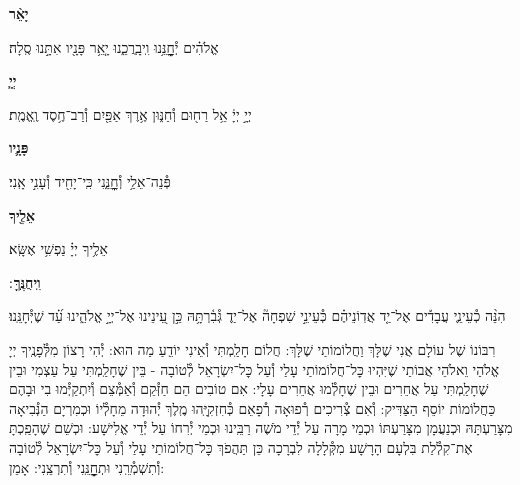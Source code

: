 \documentclass[twoside, openany, parskip=half, 11pt]{book}
\begin{document}
\textbf{יָאֵ֨ר}
\hfill \begin{footnotesize}
אֱלֹהִ֗ים יְ֯חׇׇׇׇׇׇׇׇנֵּ֥נוּ וִֽיבָֽרֲכֵ֑נוּ יָ֤אֵ֥ר פָּנָ֖יו אִתָּ֣נוּ סֶֽלָה׃\\
\end{footnotesize}
\textbf{יְיָ֧}
\hfill \begin{footnotesize}
יְיָ֣ יְיָ֔ אֵ֥ל רַח֖וּם וְ֯חַנּ֑וּן אֶ֥רֶךְ אַפַּ֖יִם וְ֯רַב־חֶ֥סֶד וֶֽאֱמֶֽת׃\\
\end{footnotesize}
\textbf{פָּנָ֛יו}
\hfill \begin{footnotesize}
פְּ֯נֵה־אֵלַ֥י וְ֯חׇׇׇׇׇׇׇׇׇׇנֵּ֑נִי כִּֽי־יָחִ֖יד וְ֯עָנִ֣י אָֽנִי׃\\
\end{footnotesize}
\textbf{אֵלֶ֖יךָ}
\hfill \begin{footnotesize}
אֵלֶ֥יךָ יְיָ֗ נַפְשִׁ֥י אֶשָּֽׂא׃\\
\end{footnotesize}
\textbf{וִֽיחֻנֶּֽךָּ}
׃ \hfill \begin{footnotesize}
הִנֵּ֨ה כְ֯עֵינֵ֢י עֲבָדִ֡ים אֶל־יַ֤ד אֲדֽוֹנֵיהֶ֗ם כְּ֯עֵינֵ֣י שִׁפְחָה֘ אֶל־יַד֢ גְּ֯בִ֫רְתָּ֥הּ כֵּ֣ן עֵ֭ינֵינוּ אֶל־יְיָ֣ אֱלֹהֵ֑ינוּ עַ֝֗ד שֶׁיְּ֯חָנֵּֽנוּ׃
\end{footnotesize}


רִבּוֹנוֹ שֶׁל עוֹלָם אֲנִי שֶׁלָּךְ וַחֲלוֹמוֹתַי שֶׁלָּךְ: חֲלוֹם חָלַֽמְתִּי וְ֯אֵינִי יוֹדֵֽעַ מַה הוּא: יְ֯הִי רָצוֹן מִלְּ֯פָנֶֽיךָ יְיָ אֱלֹהַי וֵאלֹהֵי אֲבוֹתַי שֶׁיִּהְיוּ כׇּל־חֲלוֹמוֹתַי עָלַי וְ֯עַל כׇּל־יִשְׂרָאֵל לְ֯טוֹבָה - בֵּין שֶׁחָלַֽמְתִּי עַל עַצְמִי וּבֵין שֶׁחָלַֽמְתִּי עַל אֲחֵרִים וּבֵין שֶׁחָלְ֯מוּ אֲחֵרִים עָלָי: אִם טוֹבִים הֵם חַזְּ֯קֵם וְ֯אַמְּ֯צֵם וְ֯יִתְקַיְּ֯מוּ בִי וּבָהֶם כַּחֲלוֹמוֹת יוֹסֵף הַצַּדִּיק: וְ֯אִם צְ֯רִיכִים רְ֯פוּאָה רְ֯פָאֵם כְּ֯חִזְקִיָּֽהוּ מֶֽלֶךְ יְ֯הוּדָה מֵחָלְ֯יוֹ וּכְמִרְיָם הַנְּ֯בִיאָה מִצָּרַעְתָּהּ וּכְנַעֲמָן מִצָּרַעְתּוֹ וּכְמֵי מָרָה עַל יְ֯דֵי מֹשֶׁה רַבֵּֽינוּ וּכְמֵי יְ֯רִחוֹ עַל יְ֯דֵי אֱלִישָׁע: וּכְשֵׁם שֶׁהָפַֽכְתָּ אֶת־קִלְ֯לַת בִּלְעָם הָרָשָׁע מִקְּ֯לָלָה לִבְרָכָה כֵּן תַּהֲפֹךְ כׇּל־חֲלוֹמוֹתַי עָלַי וְ֯עַל כׇּל־יִשְׂרָאֵל לְ֯טוֹבָה וְ֯תִשְׁמְ֯רֵֽנִי וּתְחׇׇׇׇׇׇׇׇׇׇנֵּֽנִי וְ֯תִרְצֵֽנִי: אָמֵן:
\end{document}

